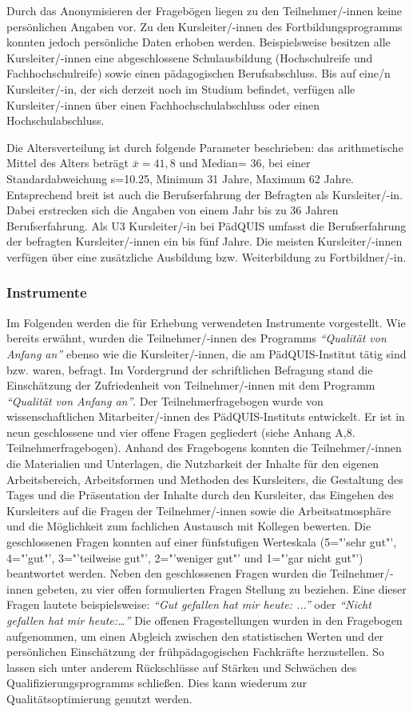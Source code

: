 \documentclass[12pt,a4paper]{article}
\begin{document}
Durch das Anonymisieren der Fragebögen liegen zu den Teilnehmer/-innen keine persönlichen Angaben vor. Zu den Kursleiter/-innen des Fortbildungsprogramms konnten jedoch persönliche Daten erhoben werden. Beispielsweise besitzen alle Kursleiter/-innen eine abgeschlossene Schulausbildung (Hochschulreife und Fachhochschulreife) so\-wie einen pädagogischen Berufsabschluss. Bis auf eine/n Kursleiter/-in, der sich derzeit noch im Studium befindet, verfügen alle Kursleiter/-innen über einen Fachhochschulabschluss oder einen Hochschulabschluss. 

Die Al\-ters\-ver\-teil\-ung ist durch folgende Parameter beschrieben: das arithmetische Mittel des Alters beträgt $\bar x= 41,8$ und Median= 36, bei einer Standardabweichung s=10.25, Minimum 31 Jahre, Maximum 62 Jahre. Entsprechend breit ist auch die Berufserfahrung der Befragten als Kursleiter/-in. Dabei erstrecken sich die Angaben von einem Jahr bis zu 36 Jahren Berufserfahrung. Als U3 Kursleiter/-in bei PädQUIS umfasst die Berufserfahrung der befragten Kursleiter/-innen ein bis fünf Jahre. Die meisten Kursleiter/-innen verfügen über eine zusätzliche Ausbildung bzw. Weiterbildung zu Fortbildner/-in.

\subsubsection{Instrumente}

Im Folgenden werden die für Erhebung verwendeten Instrumente vorgestellt. Wie bereits erwähnt, wurden die Teilnehmer/-innen des Programms \textit{"`Qualität von Anfang an"'} ebenso wie die Kursleiter/-innen, die am PädQUIS-Institut tätig sind bzw. waren, befragt. Im Vordergrund der schriftlichen Befragung stand die Einschätzung der Zufriedenheit von Teilnehmer/-innen mit dem Programm \textit{"`Qualität von Anfang an"'}. Der Teilnehmerfragebogen wurde von wissenschaftlichen Mitarbeiter/-innen des PädQUIS-Instituts entwickelt. Er ist in neun geschlossene und vier offene Fragen  gegliedert (siehe Anhang A,8. Teilnehmerfragebogen).
Anhand des Fragebogens konnten die Teilnehmer/-innen die Materialien und Unterlagen, die Nutzbarkeit der Inhalte für den eigenen Arbeitsbereich, Arbeitsformen und Methoden des Kursleiters, die Gestaltung des Tages und die Präsentation der Inhalte durch den Kursleiter, das Eingehen des Kursleiters auf die Fragen der Teilnehmer/-innen sowie die Arbeitsatmosphäre und die Möglichkeit zum fachlichen Austausch mit Kollegen bewerten. Die geschlossenen Fragen konnten auf einer fünfstufigen Werteskala (5="'sehr gut"', 4="'gut"', 3="'teilweise gut"', 2="'weniger gut"' und 1="'gar nicht gut"') beantwortet werden. Neben den geschlossenen Fragen wurden die Teilnehmer/-innen gebeten, zu vier offen formulierten Fragen Stellung zu beziehen. Eine dieser Fragen lautete beispielsweise: \textit{"`Gut gefallen hat mir heute: ..."'} oder \textit{"`Nicht gefallen hat mir heute:…"'} Die offenen Fragestellungen wurden in den Fragebogen aufgenommen, um einen Abgleich zwischen den statistischen Werten und der persönlichen Einschätzung der frühpädagogischen Fachkräfte herzustellen. So lassen sich unter anderem Rückschlüsse auf Stärken und Schwächen des Qualifizierungsprogramms schließen. Dies kann wiederum zur Qualitätsoptimierung genutzt werden.
\end{document}
